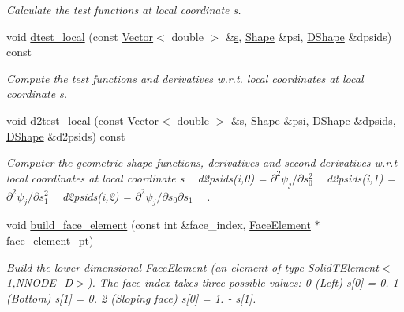 \begin{DoxyCompactItemize}
\begin{DoxyCompactList}\small\item\em Calculate the test functions at local coordinate s. \end{DoxyCompactList}\item 
void \hyperlink{classoomph_1_1C1CurvedElement_3_012_00_01NNODE__1D_01_4_a584224d462537606568ccc4fd6d0b21a}{dtest\+\_\+local} (const \hyperlink{classoomph_1_1Vector}{Vector}$<$ double $>$ \&\hyperlink{cfortran_8h_ab7123126e4885ef647dd9c6e3807a21c}{s}, \hyperlink{classoomph_1_1Shape}{Shape} \&psi, \hyperlink{classoomph_1_1DShape}{D\+Shape} \&dpsids) const
\begin{DoxyCompactList}\small\item\em Compute the test functions and derivatives w.\+r.\+t. local coordinates at local coordinate s. \end{DoxyCompactList}\item 
void \hyperlink{classoomph_1_1C1CurvedElement_3_012_00_01NNODE__1D_01_4_a17db4cc4715be25a4492c4569d4a8f41}{d2test\+\_\+local} (const \hyperlink{classoomph_1_1Vector}{Vector}$<$ double $>$ \&\hyperlink{cfortran_8h_ab7123126e4885ef647dd9c6e3807a21c}{s}, \hyperlink{classoomph_1_1Shape}{Shape} \&psi, \hyperlink{classoomph_1_1DShape}{D\+Shape} \&dpsids, \hyperlink{classoomph_1_1DShape}{D\+Shape} \&d2psids) const
\begin{DoxyCompactList}\small\item\em Computer the geometric shape functions, derivatives and second derivatives w.\+r.\+t local coordinates at local coordinate s ~\newline
d2psids(i,0) = $ \partial^2 \psi_j / \partial s_0^2 $ ~\newline
d2psids(i,1) = $ \partial^2 \psi_j / \partial s_1^2 $ ~\newline
d2psids(i,2) = $ \partial^2 \psi_j / \partial s_0 \partial s_1 $ ~\newline
. \end{DoxyCompactList}\item 
void \hyperlink{classoomph_1_1C1CurvedElement_3_012_00_01NNODE__1D_01_4_abbf443d8eed21f53dc7d4734d19859d7}{build\+\_\+face\+\_\+element} (const int \&face\+\_\+index, \hyperlink{classoomph_1_1FaceElement}{Face\+Element} $\ast$face\+\_\+element\+\_\+pt)
\begin{DoxyCompactList}\small\item\em Build the lower-\/dimensional \hyperlink{classoomph_1_1FaceElement}{Face\+Element} (an element of type \hyperlink{classoomph_1_1SolidTElement_3_011_00_01NNODE__1D_01_4}{Solid\+T\+Element$<$1,\+N\+N\+O\+D\+E\+\_\+D$>$}). The face index takes three possible values\+: 0 (Left) s\mbox{[}0\mbox{]} = 0. 1 (Bottom) s\mbox{[}1\mbox{]} = 0. 2 (Sloping face) s\mbox{[}0\mbox{]} = 1. -\/ s\mbox{[}1\mbox{]}. \end{DoxyCompactList}\end{DoxyCompactItemize}
